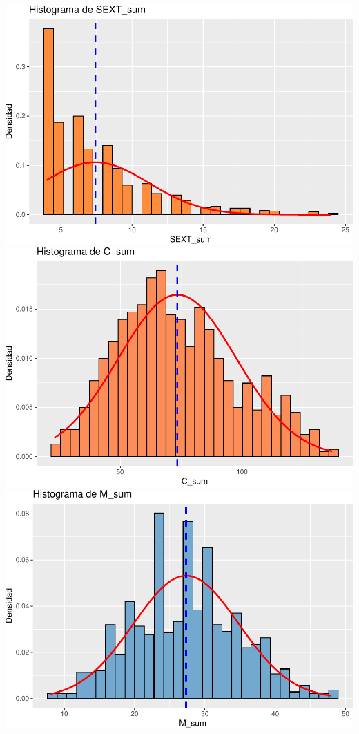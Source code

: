 \documentclass[
]{article}
\begin{document}
\includegraphics{Info_Dinix_02_files/figure-latex/30_Histos-7.pdf}
\includegraphics{Info_Dinix_02_files/figure-latex/30_Histos-8.pdf}
\includegraphics{Info_Dinix_02_files/figure-latex/30_Histos-9.pdf}
\end{document}
